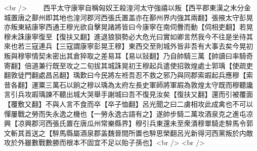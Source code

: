 <br />
　　西平太守康寧自稱匈奴王殺湟河太守強禧以叛【西平郡東漢之末分金城置唐之鄯州即其地也湟河郡河西張氏置盖亦在鄯州界内強其兩翻】張掖太守彭晃亦叛東結康寧西通王穆光欲自擊晃諸將皆曰今康寧在南伺釁而動【伺相吏翻】若晃穆未誅康寧復至【復扶又翻】進退狼狽勢必大危光曰實如卿言然我今不往是坐待其來也若三寇連兵【三寇謂康寧彭晃王穆】東西交至則城外皆非吾有大事去矣今晃初叛與穆寧情契未密出其倉猝取之差易耳【易以䜴翻】乃自帥騎三萬【帥讀曰率騎奇寄翻】倍道兼行既至攻之二旬拔其城誅晃初王穆起兵遣使招敦煌處士郭瑀【使疏吏翻敦徒門翻處昌呂翻】瑀歎曰今民將左袵吾忍不救之邪乃與同郡索嘏起兵應穆【索昔各翻】運粟三萬石以餉之穆以瑀為太府左長史軍師將軍嘏為敦煌太守既而穆聽讒言引兵攻嘏瑀諫不聽出城大哭舉手謝城曰吾不復見汝矣【復扶又翻】還而引被覆面【覆敷又翻】不與人言不食而卒【卒子恤翻】呂光聞之曰二虜相攻此成禽也不可以憚屢戰之勞而失永逸之機也【一勞永逸古語有之】遂帥步騎二萬攻酒泉克之進屯凉興【凉興郡河西張氏置在唐瓜州常樂縣界】穆引兵東還未至衆潰穆單騎走騂馬令郭文斬其首送之【騂馬縣屬酒泉郡盖魏晉間所置也騂思榮翻呂光新得河西黨叛於内敵攻於外雖數戰數勝而根本不固宜不足以貽子孫也】<br />
<br />
